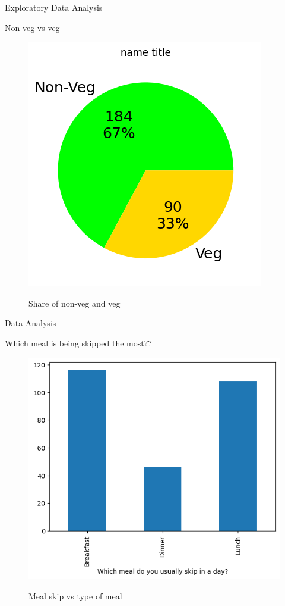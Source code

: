 \documentclass{beamer}
\begin{document}
\begin{frame}{Exploratory Data Analysis}
\begin{block}{Non-veg vs veg}
\begin{figure}
      \centering
    \caption{Share of non-veg and veg}
    \includegraphics[scale = 0.55]{pie_veg_non-veg.png}  
    \label{pie_veg_non_veg}
\end{figure}
\end{block}
\end{frame}
\begin{frame}{Data Analysis}
\begin{block}{Which meal is being skipped the most??}
\begin{figure}
      \centering
    \caption{Meal skip vs type of meal }
    \includegraphics[scale = 0.55]{bar_timing_skip.png}  
    \label{bar_timing_skip}
\end{figure}
\end{block}
\end{frame}
\end{document}
